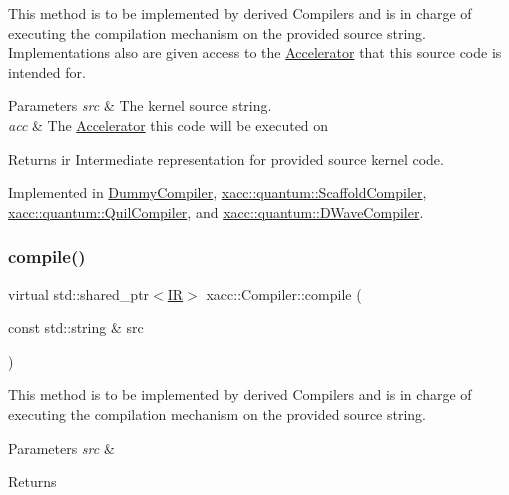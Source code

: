 This method is to be implemented by derived Compilers and is in charge of executing the compilation mechanism on the provided source string. Implementations also are given access to the \hyperlink{a02432}{Accelerator} that this source code is intended for.


\begin{DoxyParams}{Parameters}
{\em src} & The kernel source string. \\
\hline
{\em acc} & The \hyperlink{a02432}{Accelerator} this code will be executed on \\
\hline
\end{DoxyParams}
\begin{DoxyReturn}{Returns}
ir Intermediate representation for provided source kernel code. 
\end{DoxyReturn}


Implemented in \hyperlink{a02500_acc75af818d62ba22d1dd7de3b66c4baf}{Dummy\+Compiler}, \hyperlink{a01236_a7caede75bb2304ba405966651b115543}{xacc\+::quantum\+::\+Scaffold\+Compiler}, \hyperlink{a01204_a2421482415ca4e09963ea4ecddff8100}{xacc\+::quantum\+::\+Quil\+Compiler}, and \hyperlink{a01252_a0f7f6b10b4a881cb27b36eaa6d39e7b1}{xacc\+::quantum\+::\+D\+Wave\+Compiler}.

\mbox{\label{a02448_a9092f5f779b570c91569b59621280c04}} 
\subsubsection{\texorpdfstring{compile()}{compile()}\hspace{0.1cm}{\footnotesize\ttfamily [2/2]}}
{\footnotesize\ttfamily virtual std\+::shared\+\_\+ptr$<$\hyperlink{a02480}{IR}$>$ xacc\+::\+Compiler\+::compile (\begin{DoxyParamCaption}\item[{const std\+::string \&}]{src }\end{DoxyParamCaption})\hspace{0.3cm}{\ttfamily [pure virtual]}}

This method is to be implemented by derived Compilers and is in charge of executing the compilation mechanism on the provided source string. 
\begin{DoxyParams}{Parameters}
{\em src} & \\
\hline
\end{DoxyParams}
\begin{DoxyReturn}{Returns}

\end{DoxyReturn}


